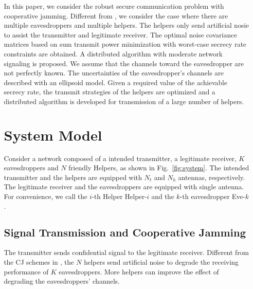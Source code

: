 \documentclass[journal]{IEEEtran}
\begin{document}
In this paper, we consider the robust secure communication problem with cooperative jamming.  Different from \cite{huang_robust_2012,Zhang_Cooperative2015}, we consider the case where there are multiple eavesdroppers and multiple helpers. The helpers only send artificial nosie to assist the transmitter and legitimate receiver. The optimal noise covariance matrices based on sum transmit power minimization with worst-case secrecy rate constraints are obtained. A distributed algorithm with moderate network signaling is proposed. 
We assume that the channels toward the eavesdropper are not perfectly known.  The uncertainties of the eavesdropper's channels are described with an ellipsoid model.   Given a required value of the achievable secrecy rate, the transmit strategies of the helpers are optimized and a distributed algorithm is developed for transmission of a large number of helpers. 


\section{System Model} \label{sec:system model}
Consider a network composed of a intended transmitter, a legitimate receiver, $K$ eavesdroppers and $N$ friendly Helpers, as shown in Fig.~\ref{fig:system}. The intended transmitter and the helpers are equipped with $N_t$ and $N_h$ antennas, respectively. The legitimate receiver and the eavesdroppers are equipped with single antenna. For convenience, we call the $i$-th Helper Helper-$i$ and the $k$-th eavesdropper Eve-$k$.

\subsection{Signal Transmission and Cooperative Jamming}
The transmitter sends confidential signal to the legitimate receiver. Different from the CJ schemes in \cite{huang_robust_2012,Zhang_Cooperative2015}, the $N$ helpers send artificial noise to degrade the receiving performance of $K$ eavesdroppers.  More helpers can improve the effect of degrading the eavesdroppers' channels. 
\end{document}
